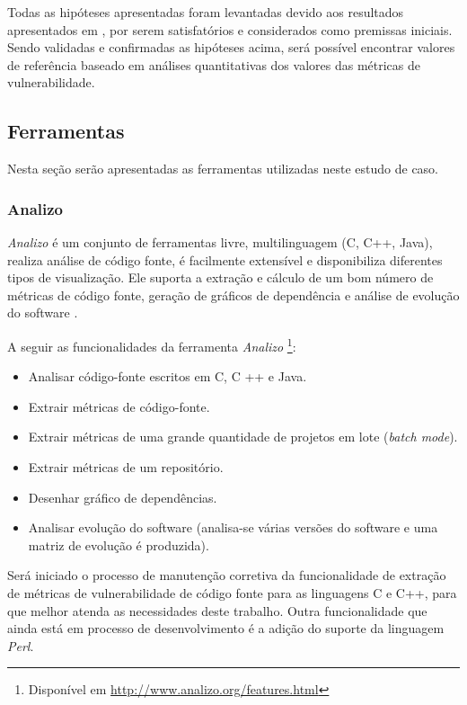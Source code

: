 Todas as hipóteses apresentadas foram levantadas devido aos resultados apresentados em
, por serem satisfatórios e
considerados como premissas iniciais. Sendo validadas e confirmadas as hipóteses
acima, será possível encontrar valores de referência baseado em análises
quantitativas dos valores das métricas de vulnerabilidade. 

\subsection{Ferramentas} \label{subsec:ferramentas}

Nesta seção serão apresentadas as ferramentas utilizadas neste estudo de caso.

\subsubsection{Analizo} \label{analizo}

\emph{Analizo} é um conjunto de ferramentas livre, multilinguagem (C, C++, Java), realiza análise de código fonte, é facilmente 
extensível e disponibiliza diferentes tipos de visualização. Ele suporta a extração e cálculo de um bom número de métricas de 
código fonte, geração de gráficos de dependência e análise de evolução do software \cite{analizo}.

A seguir as funcionalidades da ferramenta \emph{Analizo} \footnote{Disponível em
\url{http://www.analizo.org/features.html}}:

\begin{itemize}
  \item Analisar código-fonte escritos em C, C ++ e Java.
  \item Extrair métricas de código-fonte.
  \item Extrair métricas de uma grande quantidade de projetos em lote (\textit{batch mode}).
  \item Extrair métricas de um repositório.
  \item Desenhar gráfico de dependências.
  \item Analisar evolução do software (analisa-se várias versões do software e uma matriz de evolução é produzida).
\end{itemize}

Será iniciado o processo de manutenção corretiva da funcionalidade de extração de métricas de vulnerabilidade de código fonte 
para as linguagens C e C++, para que melhor atenda as necessidades deste trabalho. Outra funcionalidade que ainda está em 
processo de desenvolvimento é a adição do suporte da linguagem \textit{Perl}.

